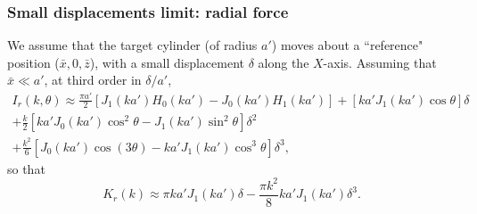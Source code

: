 \documentclass[12pt]{iopart}
\begin{document}
\subsubsection{Small displacements limit: radial force}

We assume that the target cylinder (of radius $a'$) moves about a ``reference" position ($\bar{x}, 0, \bar{z}$), with a small displacement $\delta$ along the $X$-axis. Assuming that $\bar{x}\ll a'$, at third order in $\delta/a'$,
\begin{multline}
I_r(k, \theta) \approx \frac{\pi a'}{2} [J_1(ka') H_0(ka') - J_0(ka') H_1(ka')] + [ka' J_1(ka') \cos\theta] \delta \\
+ \frac{k}{2} [ka' J_0(ka') \cos^2\theta - J_1(ka') \sin^2\theta] \delta^2 \\
+ \frac{k^2}{6}[J_0(ka')\cos(3\theta) - ka'J_1(ka') \cos^3\theta] \delta^3,
\end{multline}
so that
\begin{equation}
K_r(k) \approx \pi k a' J_1(ka') \delta - \frac{\pi k^2}{8} ka' J_1(ka') \delta^3.
\end{equation}
\end{document}
